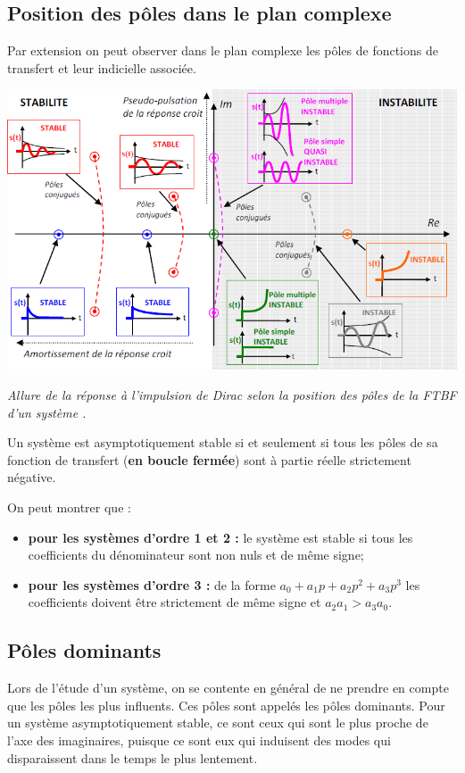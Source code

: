 \documentclass[10pt,fleqn]{article} %
\begin{document}
\subsection{Position des pôles dans le plan complexe}
Par extension on peut observer dans le plan complexe les pôles de fonctions de transfert et leur indicielle associée.

\begin{center}
\includegraphics[width=\linewidth]{images/plan_complexe_fm}

\textit{Allure de la réponse à l’impulsion de Dirac selon la position des pôles de la FTBF d’un système \cite{2}.}
\end{center}

\begin{defi}[À retenir]
Un système est asymptotiquement stable si et seulement si tous les pôles de sa fonction de transfert (\textbf{en boucle fermée}) sont à partie réelle strictement négative. 

\end{defi}

\begin{rem}On peut montrer que :
\begin{itemize}
\item \textbf{pour les systèmes d'ordre 1 et 2 :} le système est stable si tous les coefficients du dénominateur sont non nuls et de même signe;
\item \textbf{pour les systèmes d'ordre 3 :} de la forme $a_0+a_1p+a_2p^2+a_3p^3$ les coefficients doivent être strictement de même signe et $a_2 a_1 > a_3 a_0$.
\end{itemize}
\end{rem}

\subsection{Pôles dominants \cite{1}}
Lors de l’étude d’un système, on se contente en général de ne prendre en compte que les pôles les plus influents. Ces pôles sont appelés les pôles dominants. Pour un système asymptotiquement stable, ce sont ceux qui sont le plus proche de l’axe des imaginaires, puisque ce sont eux qui induisent des modes qui disparaissent dans le temps le plus lentement.
\end{document}
